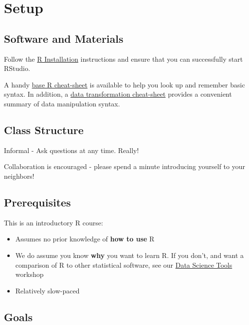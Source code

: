 \documentclass[
]{book}
\providecommand{\tightlist}{%
  \setlength{\itemsep}{0pt}\setlength{\parskip}{0pt}}
\begin{document}
\hypertarget{setup}{%
\section{Setup}\label{setup}}

\hypertarget{software-and-materials}{%
\subsection{Software and Materials}\label{software-and-materials}}

Follow the \href{./Rinstall.html}{R Installation} instructions and ensure that you can successfully start RStudio.

A handy \href{R/Rintro/base-r-cheat-sheet.pdf}{base R cheat-sheet} is available to help you look up and remember basic syntax.
In addition, a \href{R/Rintro/data-transformation-cheat-sheet.pdf}{data transformation cheat-sheet} provides a convenient summary of data manipulation syntax.

\hypertarget{class-structure}{%
\subsection{Class Structure}\label{class-structure}}

Informal - Ask questions at any time. Really!

Collaboration is encouraged - please spend a minute introducing yourself to your neighbors!

\hypertarget{prerequisites}{%
\subsection{Prerequisites}\label{prerequisites}}

This is an introductory R course:

\begin{itemize}
\tightlist
\item
  Assumes no prior knowledge of \textbf{how to use} R
\item
  We do assume you know \textbf{why} you want to learn R. If you don't, and want a comparison of R to other statistical software, see our \href{./DataScienceTools.html}{Data Science Tools} workshop
\item
  Relatively slow-paced
\end{itemize}

\hypertarget{goals}{%
\subsection{Goals}\label{goals}}
\end{document}
